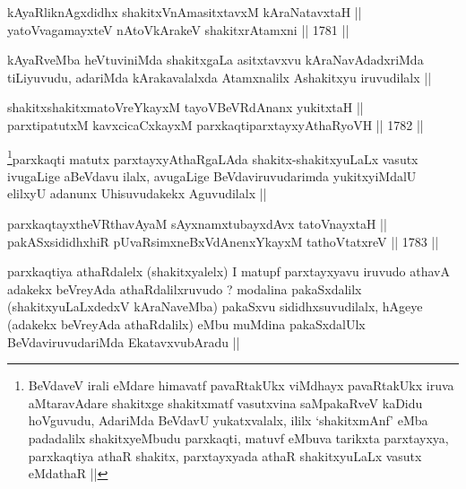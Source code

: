
\begin{shl}
kAyaRliknAgxdidhx shakitxVnAmasitxtavxM kAraNatavxtaH || \\
yatoV\s vagamayxteV nAtoV\s kArakeV shakitxrAtamxni ||  1781 ||  
\end{shl}

\begin{artha}
kAyaRveMba heVtuviniMda shakitxgaLa asitxtavxvu kAraNavAdadxriMda
tiLiyuvudu, adariMda kArakavalalxda Atamxnalilx Ashakitxyu iruvudilalx ||
\end{artha}


\begin{shl}
shakitxshakitxmatoVreYkayxM tayoVBeVRdAnanx yukitxtaH || \\
parxtipatutxM kavxcicaCxkayxM parxkaqtiparxtayxyAthaRyoVH ||  1782 ||  
\end{shl}

\begin{artha}
\footnote[1]{BeVdaveV irali eMdare himavatf pavaRtakUkx viMdhayx
  pavaRtakUkx iruva aMtaravAdare shakitxge shakitxmatf vasutxvina
  saMpakaRveV kaDidu hoVguvudu, AdariMda BeVdavU yukatxvalalx, ililx
  `shakitxmAnf' eMba padadalilx shakitxyeMbudu parxkaqti, matuvf
  eMbuva tarikxta parxtayxya, parxkaqtiya athaR shakitx, parxtayxyada
  athaR shakitxyuLaLx vasutx eMdathaR ||}parxkaqti matutx parxtayxyAthaRgaLAda
shakitx-shakitxyuLaLx vasutx ivugaLige aBeVdavu ilalx, avugaLige
BeVdaviruvudarimda yukitxyiMdalU elilxyU adanunx Uhisuvudakekx
Aguvudilalx ||
\end{artha}


\begin{shl}
parxkaqtayxtheVR\s thavA\s yaM sAyxnamxtubayxdAvx tatoV\s nayxtaH ||  \\
pakASxsididhxhiR pUvaRsimxneBxVdAnenxYkayxM tathoVtatxreV ||  1783 ||  
\end{shl}

\begin{artha}
parxkaqtiya athaRdalelx (shakitxyalelx) I matupf parxtayxyavu iruvudo
athavA adakekx beVreyAda athaRdalilxruvudo ? modalina pakaSxdalilx
(shakitxyuLaLxdedxV kAraNaveMba) pakaSxvu sididhxsuvudilalx, hAgeye
(adakekx beVreyAda athaRdalilx) eMbu muMdina pakaSxdalUlx
BeVdaviruvudariMda EkatavxvubAradu ||
\end{artha}

